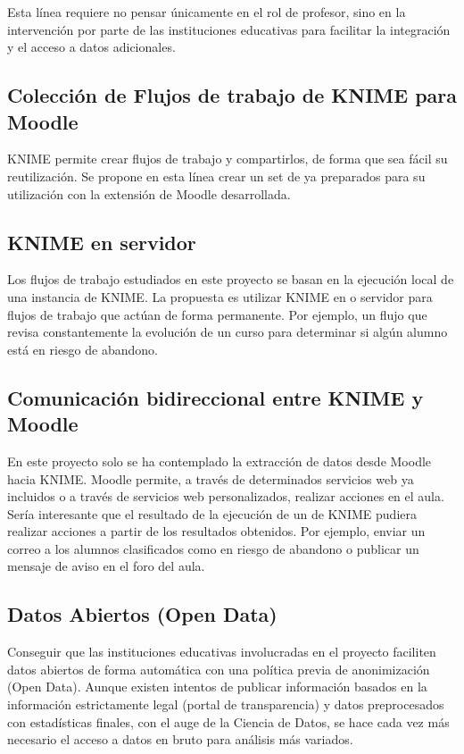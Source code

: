 Esta línea requiere no pensar únicamente en el rol de profesor, sino en la intervención por parte de las instituciones educativas para facilitar la integración 
y el acceso a datos adicionales. 


\subsection{Colección de Flujos de trabajo de KNIME para Moodle}

KNIME permite crear flujos de trabajo y compartirlos, de forma que sea fácil su reutilización. Se propone en esta línea crear un set de 
 ya preparados para su utilización con la extensión de Moodle desarrollada. 


\subsection{KNIME en servidor}

Los flujos de trabajo estudiados en este proyecto se basan en la ejecución local de una instancia de KNIME. La propuesta es utilizar 
KNIME en  o servidor para flujos de trabajo que actúan de forma permanente. Por ejemplo, un flujo que revisa constantemente la evolución de un curso para 
determinar si algún alumno está en riesgo de abandono. 

\subsection{Comunicación bidireccional entre KNIME y Moodle}

En este proyecto solo se ha contemplado la extracción de datos desde Moodle hacia KNIME. Moodle permite, a través de determinados 
servicios web ya incluidos o a través de servicios web personalizados, realizar acciones en el aula. Sería interesante que el resultado 
de la ejecución de un  de KNIME pudiera realizar acciones a partir de los resultados obtenidos. Por ejemplo, enviar un correo a
 los alumnos clasificados como en riesgo de abandono o publicar un mensaje de aviso en el foro del aula. 
 
\subsection{Datos Abiertos (Open Data)}

Conseguir que las instituciones educativas involucradas en el proyecto faciliten datos abiertos de forma automática con una política previa de anonimización (Open Data). 
Aunque existen intentos de publicar información basados en la información estrictamente legal (portal de transparencia) y datos preprocesados 
con estadísticas finales, con el auge de la Ciencia de Datos, se hace cada vez más necesario el acceso a datos en bruto para análisis más variados. 

